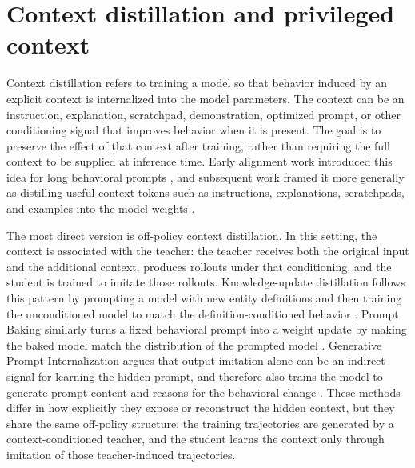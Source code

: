 \section{Context distillation and privileged context}

Context distillation refers to training a model so that behavior induced by an explicit context is internalized into the model parameters. The context can be an instruction, explanation, scratchpad, demonstration, optimized prompt, or other conditioning signal that improves behavior when it is present. The goal is to preserve the effect of that context after training, rather than requiring the full context to be supplied at inference time. Early alignment work introduced this idea for long behavioral prompts \citep{askell2021GeneralLanguageAssistant}, and subsequent work framed it more generally as distilling useful context tokens such as instructions, explanations, scratchpads, and examples into the model weights \citep{snell2022LearningDistillingContext}.

The most direct version is off-policy context distillation. In this setting, the context is associated with the teacher: the teacher receives both the original input and the additional context, produces rollouts under that conditioning, and the student is trained to imitate those rollouts. Knowledge-update distillation follows this pattern by prompting a model with new entity definitions and then training the unconditioned model to match the definition-conditioned behavior \citep{padmanabhan2023PropagatingKnowledgeUpdates}. Prompt Baking similarly turns a fixed behavioral prompt into a weight update by making the baked model match the distribution of the prompted model \citep{bhargava2024PromptBaking}. Generative Prompt Internalization argues that output imitation alone can be an indirect signal for learning the hidden prompt, and therefore also trains the model to generate prompt content and reasons for the behavioral change \citep{shin2025GenerativePromptInternalization}. These methods differ in how explicitly they expose or reconstruct the hidden context, but they share the same off-policy structure: the training trajectories are generated by a context-conditioned teacher, and the student learns the context only through imitation of those teacher-induced trajectories.

